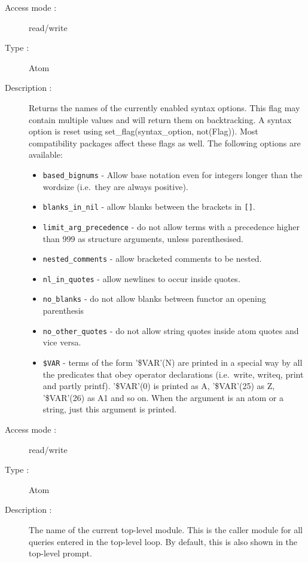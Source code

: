 \begin{description}
\pagebreak[3]
\begin{description}
\item[Access mode : ] read/write 
\item[Type : ] Atom
\item[Description : ] Returns the names of the currently enabled syntax options.
This flag may contain multiple values and will return them on backtracking.
A syntax option is reset using set_flag(syntax_option, not(Flag)).
Most compatibility packages affect these flags as well.
The following options are available:
\begin{itemize}
\item {\tt based_bignums} - Allow base notation even for integers
longer than the wordsize (i.e.\ they are always positive).
\item {\tt blanks_in_nil} - allow blanks between the brackets in {\tt []}.
\item {\tt limit_arg_precedence} - do not allow terms with a precedence higher
than 999 as structure arguments, unless parenthesised.
\item {\tt nested_comments} - allow bracketed comments to be nested.
\item {\tt nl_in_quotes} - allow newlines to occur inside quotes.
\item {\tt no_blanks} - do not allow blanks between functor an opening
parenthesis
\item {\tt no_other_quotes} - do not allow string quotes inside atom quotes
and vice versa.
\item {\tt \$VAR} - terms of the form '\$VAR'(N) are printed in a special way by all the predicates that obey operator declarations (i.e.\ write, writeq, print and partly printf). '\$VAR'(0) is printed as A, '\$VAR'(25) as Z, '\$VAR'(26) as A1 and so on. 
When the argument is an atom or a string, just this argument is printed.
\end{itemize}
\end{description}

\begin{description}
\item[Access mode : ] read/write
\item[Type : ] Atom 
\item[Description : ] The name of the current top-level module. This is the
caller module for all queries entered in the top-level loop.
By default, this is also shown in the top-level prompt.
\end{description}


\end{description}
